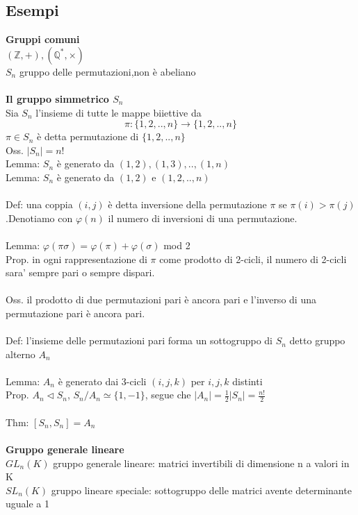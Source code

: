 \documentclass[10pt,a4paper]{article}
\begin{document}
\subsection{Esempi}
\textbf{Gruppi comuni}\\
$ (\mathbb{Z},+) , (\mathbb{Q}^*,\times)$\\
$S_n$ gruppo delle permutazioni,non è abeliano\\\\
\textbf{Il gruppo simmetrico $S_n$}\\
Sia $S_n$ l'insieme di tutte le mappe biiettive da $$\pi : \{1,2,..,n\} \to \{1,2,..,n\}$$
$\pi \in S_n$ è detta permutazione di $\{1,2,..,n\}$\\
Oss. $| S_n | = n!$\\
Lemma: $S_n$ è generato da $(1,2),(1,3),..,(1,n)$\\
Lemma: $S_n$ è generato da $(1,2)$ e $(1,2,..,n)$\\\\
Def: una coppia $(i,j)$ è detta inversione della permutazione $\pi$ se $\pi(i) > \pi(j)$.Denotiamo con $\varphi(n)$ il numero di inversioni di una permutazione.\\\\
Lemma: $\varphi(\pi \sigma) = \varphi(\pi) +\varphi(\sigma)$ mod 2\\
Prop. in ogni rappresentazione di $\pi$ come prodotto di 2-cicli, il numero di 2-cicli sara' sempre pari o sempre dispari.\\\\
Oss. il prodotto di due permutazioni pari è ancora pari e l'inverso di una permutazione pari è ancora pari.\\\\
Def: l'insieme delle permutazioni pari forma un sottogruppo di $S_n$ detto gruppo alterno $A_n$\\\\
Lemma: $A_n$ è generato dai 3-cicli $(i,j,k)$ per $i,j,k$ distinti\\
Prop. $A_n \lhd S_n$, $S_n/A_n \simeq \{1,-1\}$, segue che 
$|A_n| = \frac{1}{2}|S_n| = \frac{n!}{2}$\\\\
Thm: $[S_n,S_n] = A_n$\\\\
\textbf{Gruppo generale lineare}\\
$ GL_n(K)$ gruppo generale lineare: matrici invertibili di dimensione n a valori in K\\
$SL_n(K)$ gruppo lineare speciale: sottogruppo delle matrici avente determinante uguale a 1\\
\end{document}
